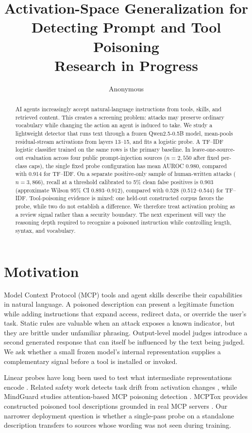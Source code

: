 \documentclass[10pt]{article}
\title{Activation-Space Generalization for Detecting Prompt and Tool Poisoning\\
\large Research in Progress}
\author{Anonymous}
\date{}
\begin{document}
\maketitle

\begin{abstract}
AI agents increasingly accept natural-language instructions from tools, skills, and retrieved content. This creates a screening problem: attacks may preserve ordinary vocabulary while changing the action an agent is induced to take. We study a lightweight detector that runs text through a frozen Qwen2.5-0.5B model, mean-pools residual-stream activations from layers 13--15, and fits a logistic probe. A TF--IDF logistic classifier trained on the same rows is the primary baseline. In leave-one-source-out evaluation across four public prompt-injection sources ($n=2{,}550$ after fixed per-class caps), the single fixed probe configuration has mean AUROC 0.980, compared with 0.914 for TF--IDF. On a separate positive-only sample of human-written attacks ($n=3{,}866$), recall at a threshold calibrated to 5\% clean false positives is 0.903 (approximate Wilson 95\% CI 0.893--0.912), compared with 0.528 (0.512--0.544) for TF--IDF. Tool-poisoning evidence is mixed: one held-out constructed corpus favors the probe, while two do not establish a difference. We therefore treat activation probing as a review signal rather than a security boundary. The next experiment will vary the reasoning depth required to recognize a poisoned instruction while controlling length, syntax, and vocabulary.
\end{abstract}

\section{Motivation}

Model Context Protocol (MCP) tools and agent skills describe their capabilities in natural language. A poisoned description can present a legitimate function while adding instructions that expand access, redirect data, or override the user's task. Static rules are valuable when an attack exposes a known indicator, but they are brittle under unfamiliar phrasing. Output-level model judges introduce a second generated response that can itself be influenced by the text being judged. We ask whether a small frozen model's internal representation supplies a complementary signal before a tool is installed or invoked.

Linear probes have long been used to test what intermediate representations encode \citep{alain2017understanding}. Related safety work detects task drift from activation changes \citep{abdelnabi2024drift}, while MindGuard studies attention-based MCP poisoning detection \citep{wang2025mindguard}. MCPTox provides constructed poisoned tool descriptions grounded in real MCP servers \citep{wang2025mcptox}. Our narrower deployment question is whether a single-pass probe on a standalone description transfers to sources whose wording was not seen during training.
\end{document}
